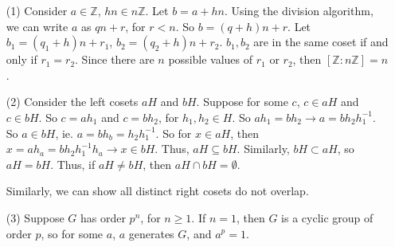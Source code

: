 %
%
\begin{itemize}
\item[(1)]
Consider $a \in \mathbb{Z}$, $hn \in n\mathbb{Z}$. Let $b = a + hn$. Using the division algorithm, we can write $a$ as $qn + r$, for $r < n$. So $b = (q + h)n + r$. Let $b_1 = (q_1 + h)n + r_1$, $b_2 = (q_2 + h)n + r_2$. $b_1, b_2$ are in the same coset if and only if $r_1 = r_2$. Since there are $n$ possible values of $r_1$ or $r_2$, then $[\mathbb{Z} : n\mathbb{Z}] = n$.
\item[(2)]
Consider the left cosets $aH$ and $bH$. Suppose for some $c$, $c \in aH$ and $c \in bH$. So $c = ah_1$ and $c = bh_2$, for $h_1, h_2 \in H$. So $ah_1 = bh_2 \rightarrow a = bh_2h_1^{-1}$. So $a \in bH$, ie. $a = bh_b = h_2h_1^{-1}$. So for $x \in aH$, then $x = ah_a = bh_2h_1^{-1}h_a \rightarrow x \in bH$. Thus, $aH \subseteq bH$. Similarly, $bH \subset aH$, so $aH = bH$. Thus, if $aH \neq bH$, then $aH \cap bH = \emptyset$.

Similarly, we can show all distinct right cosets do not overlap.
\item[(3)]
Suppose $G$ has order $p^n$, for $n \geq 1$. If $n = 1$, then $G$ is a cyclic group of order $p$, so for some $a$, $a$ generates $G$, and $a^p = 1$.


\end{itemize}
